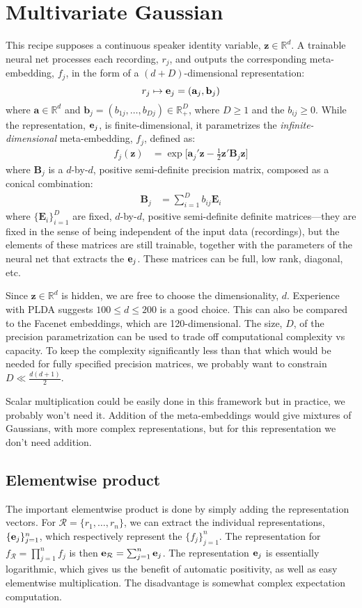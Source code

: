 \documentclass[a4paper,oneside,12pt,english]{report}
\def\zvec{\mathbf{z}}
\def\R{\mathbb{R}}
\def\Bmat{\mathbf{B}}
\def\Emat{\mathbf{E}}
\def\avec{\mathbf{a}}
\def\bvec{\mathbf{b}}
\def\Rset{\mathcal{R}}
\begin{document}
\section{Multivariate Gaussian}
\label{sec:MVG}
\def\dvec{\mathbf{d}}
This recipe supposes a continuous speaker identity variable, $\zvec\in\R^d$. A trainable neural net processes each recording, $r_j$, and outputs the corresponding meta-embedding, $f_j$, in the form of a $(d+D)$-dimensional representation:
$$r_j\mapsto\evec_j=(\avec_j,\bvec_j)$$
where $\avec\in\R^d$ and $\bvec_j=(b_{1j},\ldots,b_{Dj})\in\R_+^D$, where $D\ge1$ and the $b_{ij}\ge0$. While the representation, $\mathbf{e}_j$, is finite-dimensional, it parametrizes the \emph{infinite-dimensional} meta-embedding, $f_j$, defined as:
\begin{align}
\label{eq:gaussembed}
f_j(\zvec) &= \exp\bigl[\avec_j'\zvec -\frac12\zvec'\Bmat_j\zvec]
\end{align}
where $\Bmat_j$ is a $d$-by-$d$, positive semi-definite precision matrix, composed as a conical combination:
\begin{align}
\label{eq:Bmat}
\Bmat_j &= \sum_{i=1}^D b_{ij} \Emat_i
\end{align}
where $\{\Emat_i\}_{i=1}^D$ are fixed, $d$-by-$d$, positive semi-definite definite matrices---they are fixed in the sense of being independent of the input data (recordings), but the elements of these matrices are still trainable, together with the parameters of the neural net that extracts the $\mathbf{e}_j$. These matrices can be full, low rank, diagonal, etc. 

Since $\zvec\in\R^d$ is hidden, we are free to choose the dimensionality, $d$. Experience with PLDA suggests $100\le d\le200$ is a good choice. This can also be compared to the Facenet embeddings, which are 120-dimensional. The size, $D$, of the precision parametrization can be used to trade off computational complexity vs capacity. To keep the complexity significantly less than that which would be needed for fully specified precision matrices, we probably want to constrain $D\ll\frac{d(d+1)}{2}$. 

Scalar multiplication could be easily done in this framework but in practice, we probably won't need it. Addition of the meta-embeddings would give mixtures of Gaussians, with more complex representations, but for this representation we don't need addition.

\subsection{Elementwise product}
The important elementwise product is done by simply adding the representation vectors. For $\Rset=\{r_1,\ldots,r_n\}$, we can extract the individual representations, $\{\mathbf{e}_j\}_{j=1}^n$, which respectively represent the $\{f_j\}_{j=1}^n$. The representation for $f_\Rset=\prod_{j=1}^n f_j$ is then $\evec_\Rset=\sum_{j=1}^n \evec_j$. The representation $\mathbf{e}_j$ is essentially logarithmic, which gives us the benefit of automatic positivity, as well as easy elementwise multiplication. The disadvantage is somewhat complex expectation computation.
\end{document}

